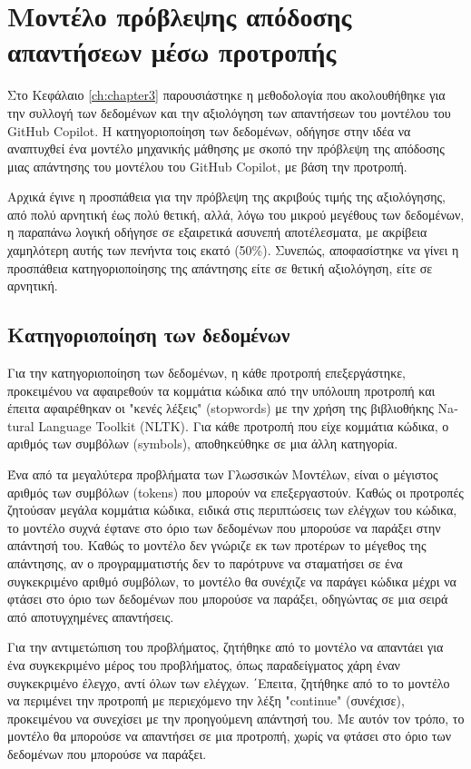 \chapter{Μοντέλο πρόβλεψης απόδοσης απαντήσεων μέσω προτροπής}
\label{ch:chapter4}

Στο Κεφάλαιο \ref{ch:chapter3} παρουσιάστηκε η μεθοδολογία που
ακολουθήθηκε για την συλλογή των δεδομένων και την αξιολόγηση των
απαντήσεων του μοντέλου του \textlatin{GitHub Copilot}. Η
κατηγοριοποίηση των δεδομένων, οδήγησε στην ιδέα να αναπτυχθεί ένα
μοντέλο μηχανικής μάθησης με σκοπό την πρόβλεψη της απόδοσης μιας
απάντησης του μοντέλου του \textlatin{GitHub Copilot}, με βάση την
προτροπή.

Aρχικά έγινε η προσπάθεια για την πρόβλεψη της
ακριβούς τιμής της αξιολόγησης, από πολύ αρνητική έως πολύ θετική, αλλά,
λόγω του μικρού μεγέθους των δεδομένων, η παραπάνω λογική οδήγησε σε
εξαιρετικά ασυνεπή αποτέλεσματα, με ακρίβεια χαμηλότερη αυτής των
πενήντα τοις εκατό (50\%). Συνεπώς, αποφασίστηκε να γίνει η προσπάθεια
κατηγοριοποίησης της απάντησης είτε σε θετική αξιολόγηση, είτε σε
αρνητική.

\section{Κατηγοριοποίηση των δεδομένων}

Για την κατηγοριοποίηση των δεδομένων, η κάθε προτροπή επεξεργάστηκε,
προκειμένου να αφαιρεθούν τα κομμάτια κώδικα από την υπόλοιπη προτροπή
και έπειτα αφαιρέθηκαν οι "κενές λέξεις" (\textlatin{stopwords}) με την
χρήση της βιβλιοθήκης \textlatin{Natural Language Toolkit (NLTK)}. Για
κάθε προτροπή που είχε κομμάτια κώδικα, ο αριθμός των συμβόλων
(\textlatin{symbols}), αποθηκεύθηκε σε μια άλλη κατηγορία.

Ένα από τα μεγαλύτερα προβλήματα των Γλωσσικών Μοντέλων, είναι ο
μέγιστος αριθμός των συμβόλων (\textlatin{tokens}) που μπορούν να
επεξεργαστούν. Καθώς οι προτροπές ζητούσαν μεγάλα κομμάτια κώδικα, ειδικά στις
περιπτώσεις των ελέγχων του κώδικα, το μοντέλο συχνά έφτανε στο όριο των
δεδομένων που μπορούσε να παράξει στην απάντησή του. Καθώς το μοντέλο
δεν γνώριζε εκ των προτέρων το μέγεθος της απάντησης, αν ο
προγραμματιστής δεν το παρότρυνε να σταματήσει σε ένα συγκεκριμένο
αριθμό συμβόλων, το μοντέλο θα συνέχιζε να παράγει κώδικα μέχρι να
φτάσει στο όριο των δεδομένων που μπορούσε να παράξει, οδηγώντας σε μια
σειρά από αποτυγχημένες απαντήσεις.

Για την αντιμετώπιση του προβλήματος, ζητήθηκε από το
μοντέλο να απαντάει για ένα συγκεκριμένο μέρος του προβλήματος, όπως
παραδείγματος χάρη έναν συγκεκριμένο έλεγχο, αντί όλων των ελέγχων.
΄Επειτα, ζητήθηκε από το το μοντέλο να περιμένει την προτροπή με
περιεχόμενο την λέξη "\textlatin{continue}" (συνέχισε), προκειμένου να
συνεχίσει με την προηγούμενη απάντησή του. Με αυτόν τον τρόπο, το
μοντέλο θα μπορούσε να απαντήσει σε μια προτροπή, χωρίς να φτάσει στο
όριο των δεδομένων που μπορούσε να παράξει.

